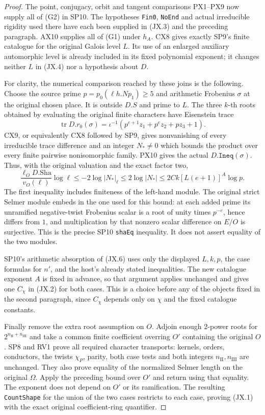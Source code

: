 \begin{proof}
The point, conjugacy, orbit and tangent comparisons
PX1--PX9 now supply all of (G2) in SP10.
The hypotheses \texttt{Fin0}, \texttt{NoEnd} and
actual irreducible rigidity used there have each been
supplied in (JX.3) and the preceding paragraph.
AX10 supplies all of (G1) under $h_A$.
CX8 gives exactly SP9's finite catalogue for the
original Galois level $L$.  Its use of an enlarged
auxiliary automorphic level is already included in
its fixed polynomial exponent; it changes neither
$L$ in (JX.4) nor a hypothesis about $D$.

For clarity, the numerical comparison reached by
these joins is the following.  Choose the source
prime $p=p_0(\ell h.Np_1)\ge5$ and arithmetic
Frobenius $\sigma$ at the original chosen place.
It is outside $D.S$ and prime to $L$.  The three
$k$-th roots obtained by evaluating the original
finite characters have Eisenstein trace
\[
 \operatorname{tr}D.r_0(\sigma)
   =\iota^{-1}(p^{e+1}z_1+p^ez_2+pz_3+1).
                                                               \tag{JX.5}
\]
CX9, or equivalently CX8 followed by SP9, gives
nonvanishing of every irreducible trace difference
and an integer $N_*\ne0$ which bounds the product
over every finite pairwise nonisomorphic family.
PX10 gives the actual $D.\texttt{Ineq}(\sigma)$.
Thus, with the original valuation and the exact
factor two,
\[
 \frac{\ell_O D.\mathrm{Sha}}{v_O(\ell)}\log\ell
 \le -2\log|N_*|_\ell
 \le 2\log|N_*|
 \le 2Ck[L(e+1)]^A\log p.                                     \tag{JX.6}
\]
The first inequality includes finiteness of the
left-hand module.  The original strict Selmer
module embeds in the one used for this bound:
at each added prime its unramified negative-twist
Frobenius scalar is a root of unity times $p^{-e}$,
hence differs from $1$, and multiplication by that
nonzero scalar difference on $E/O$ is surjective.
This is the precise SP10 \texttt{shaEq} inequality.
It does not assert equality of the two modules.

SP10's arithmetic absorption of (JX.6) uses only
the displayed $L,k,p$, the case formulas for $n'$,
and the host's already stated inequalities.
The new catalogue exponent $A$ is fixed in advance,
so that argument applies unchanged and gives one
$C_\chi$ in (JX.2) for both cases.  This is a choice
before any of the objects fixed in the second
paragraph, since $C_\chi$ depends only on $\chi$
and the fixed catalogue constants.

Finally remove the extra root assumption on $O$.
Adjoin enough $2$-power roots for
$2^{n_{\mathrm{II}}+n_{\mathrm{III}}}$ and take a
common finite coefficient overring $O'$ containing
the original $O$.  SP8 and RV1 prove all required
character transports: kernels, orders, conductors,
the twists $\chi_P$, parity, both case tests and
both integers $n_{\mathrm{II}},n_{\mathrm{III}}$
are unchanged.  They also prove equality of the
normalized Selmer length on the original $\Omega$.
Apply the preceding bound over $O'$ and return
using that equality.  The exponent does not
depend on $O'$ or its ramification.  The resulting
\texttt{CountShape} for the union of the two cases
restricts to each case, proving (JX.1) with the
exact original coefficient-ring quantifier.
\end{proof}

